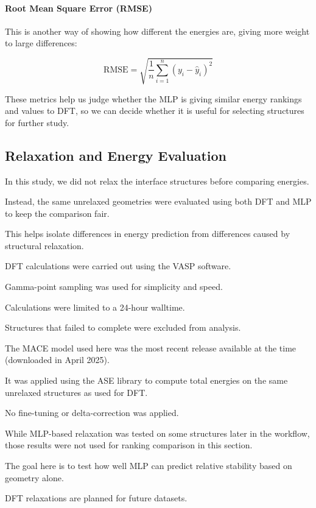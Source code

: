 \paragraph{Root Mean Square Error (RMSE)}


This is another way of showing how different the energies are, giving more weight to large differences:


\[
\text{RMSE} = \sqrt{\frac{1}{n} \sum_{i=1}^{n} (y_i - \hat{y}_i)^2}
\]


These metrics help us judge whether the MLP is giving similar energy rankings and values to DFT, so we can decide
whether it is useful for selecting structures for further study.


\subsection{Relaxation and Energy Evaluation}


In this study, we did not relax the interface structures before comparing energies.

Instead, the same unrelaxed geometries were evaluated using both DFT and MLP to keep the comparison fair.

This helps isolate differences in energy prediction from differences caused by structural relaxation.


DFT calculations were carried out using the VASP software.

Gamma-point sampling was used for simplicity and speed.

Calculations were limited to a 24-hour walltime.

Structures that failed to complete were excluded from analysis.


The MACE model used here was the most recent release available at the time (downloaded in April 2025).

It was applied using the ASE library to compute total energies on the same unrelaxed structures as used for DFT.

No fine-tuning or delta-correction was applied.


While MLP-based relaxation was tested on some structures later in the workflow, those results were not used for ranking
comparison in this section.

The goal here is to test how well MLP can predict relative stability based on geometry alone.

DFT relaxations are planned for future datasets.

